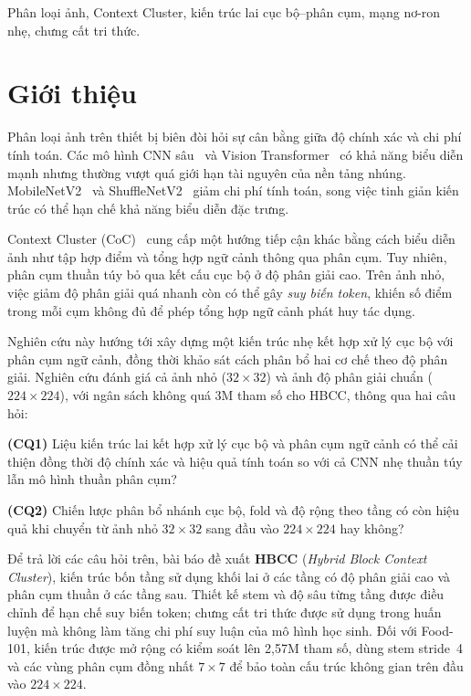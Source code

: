 \documentclass[conference]{IEEEtran}
\begin{document}
\begin{IEEEkeywords}
Phân loại ảnh, Context Cluster, kiến trúc lai cục bộ--phân cụm,
mạng nơ-ron nhẹ, chưng cất tri thức.
\end{IEEEkeywords}

\section{Giới thiệu}
\label{sec:intro}

Phân loại ảnh trên thiết bị biên đòi hỏi sự cân bằng giữa độ chính xác
và chi phí tính toán. Các mô hình CNN sâu~\cite{He2016ResNet} và Vision
Transformer~\cite{Dosovitskiy2021ViT} có khả năng biểu diễn mạnh nhưng
thường vượt quá giới hạn tài nguyên của nền tảng nhúng.
MobileNetV2~\cite{Sandler2018MobileNetV2} và
ShuffleNetV2~\cite{Ma2018ShuffleNetV2} giảm chi phí tính toán, song
việc tinh giản kiến trúc có thể hạn chế khả năng biểu diễn đặc trưng.

Context Cluster (CoC)~\cite{Ma2023ImageAsSetOfPoints} cung cấp một
hướng tiếp cận khác bằng cách biểu diễn ảnh như tập hợp điểm và tổng
hợp ngữ cảnh thông qua phân cụm. Tuy nhiên, phân cụm thuần túy bỏ qua
kết cấu cục bộ ở độ phân giải cao. Trên ảnh nhỏ, việc giảm độ phân giải
quá nhanh còn có thể gây \emph{suy biến token}, khiến số điểm trong mỗi
cụm không đủ để phép tổng hợp ngữ cảnh phát huy tác dụng.

Nghiên cứu này hướng tới xây dựng một kiến trúc nhẹ kết hợp xử lý cục
bộ với phân cụm ngữ cảnh, đồng thời khảo sát cách phân bổ hai cơ chế
theo độ phân giải. Nghiên cứu đánh giá cả ảnh nhỏ
($32\!\times\!32$) và ảnh độ phân giải chuẩn
($224\!\times\!224$), với ngân sách không quá 3M tham số cho HBCC,
thông qua hai câu hỏi:

\noindent\textbf{(CQ1)} Liệu kiến trúc lai kết hợp xử lý cục bộ và phân cụm ngữ cảnh có thể cải thiện đồng thời độ chính xác và hiệu quả tính toán so với cả CNN nhẹ thuần túy lẫn mô hình thuần phân cụm?

\noindent\textbf{(CQ2)} Chiến lược phân bổ nhánh cục bộ, fold và độ rộng theo tầng có còn hiệu quả khi chuyển từ ảnh nhỏ $32\!\times\!32$ sang đầu vào $224\!\times\!224$ hay không?

Để trả lời các câu hỏi trên, bài báo đề xuất \textbf{HBCC}
(\textit{Hybrid Block Context Cluster}), kiến trúc bốn tầng sử
dụng khối lai ở các tầng có độ phân giải cao và phân cụm thuần ở các
tầng sau. Thiết kế stem và độ sâu từng tầng được điều chỉnh để hạn chế
suy biến token; chưng cất tri thức được sử dụng trong huấn luyện mà
không làm tăng chi phí suy luận của mô hình học sinh.
Đối với Food-101, kiến trúc được mở rộng có kiểm soát lên 2,57M tham
số, dùng stem stride~4 và các vùng phân cụm đồng nhất $7\!\times\!7$
để bảo toàn cấu trúc không gian trên đầu vào $224\!\times\!224$.
\end{document}
